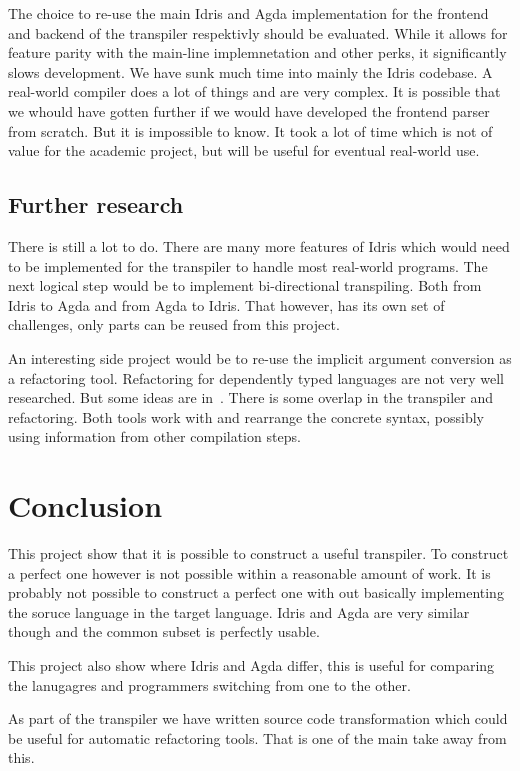 The choice to re-use the main Idris and Agda implementation for the frontend
and backend of the transpiler respektivly should be evaluated. While it allows
for feature parity with the main-line implemnetation and other perks, it
significantly slows development. We have sunk much time into mainly the Idris
codebase. A real-world compiler does a lot of things and are very
complex. It is possible that we
whould have gotten further if we would have developed the frontend parser from
scratch. But it is impossible to know. It took a lot of time which is not of
value for the academic project, but will be useful for eventual real-world use.


\subsection{Further research}
There is still a lot to do. There are many more features of Idris which would
need to be implemented for the transpiler to handle most real-world programs.
The next logical step would be to implement bi-directional transpiling. Both
from Idris to Agda and from Agda to Idris. That however, has its own set of
challenges, only parts can be reused from this project.

An interesting side project would be to re-use the implicit argument conversion
as a refactoring tool. Refactoring for dependently typed languages are not very
well researched. But some ideas are in~\cite{wibergh2019}. There is some
overlap in the transpiler and refactoring. Both tools work with and rearrange
the concrete syntax, possibly using information from other compilation steps.


\section{Conclusion}

This project show that it is possible to construct
a useful transpiler. To construct a perfect one however is not possible within
a reasonable amount of work. It is probably not possible to construct a perfect
one with out basically implementing the soruce language in the target language.
Idris and Agda are very similar though and the common subset is perfectly
usable.

This project also show where Idris and Agda differ, this is useful for
comparing the lanugagres and programmers switching from one to the other.

As part of the transpiler we have written source code transformation which
could be useful for automatic refactoring tools. That is one of the main take
away from this.



